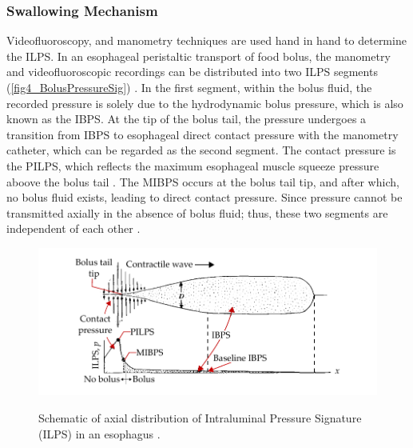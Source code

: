 

\subsubsection{Swallowing Mechanism}


Videofluoroscopy, and manometry techniques are used hand in hand to determine the \ac{ILPS}. In an esophageal peristaltic transport of food bolus, the manometry and videofluoroscopic recordings can be distributed into two \ac{ILPS} segments (\autoref{fig4_BolusPressureSig}) \cite{brasseur1987fluid,ren1993determinants,ghosh2006physiology}. In the first segment, within the bolus fluid, the recorded pressure is solely due to the hydrodynamic bolus pressure, which is also known as the \ac{IBPS}. At the tip of the bolus tail, the pressure undergoes a transition from \ac{IBPS} to esophageal direct contact pressure with the manometry catheter, which can be regarded as the second segment. The contact pressure is the \ac{PILPS}, which reflects the maximum esophageal muscle squeeze pressure aboove the bolus tail \citep{ghosh2006physiology}. The \ac{MIBPS} occurs at the bolus tail tip, and after which, no bolus fluid exists, leading to direct contact pressure. Since pressure cannot be transmitted axially in the absence of bolus fluid; thus, these two segments are independent of each other \cite{brasseur1987fluid}.  

\begin{figure}[bth]
	\myfloatalign
	{\includegraphics[width=\linewidth]{images/Ch2/fig4_BolusPressureSig}} \quad
	\caption[Schematic of axial distribution of intraluminal pressure signature  (ILPS) in an esophagus.]{Schematic of axial distribution of Intraluminal Pressure Signature  (ILPS) in an esophagus \cite{brasseur1987fluid}.}\label{fig4_BolusPressureSig}
\end{figure}

